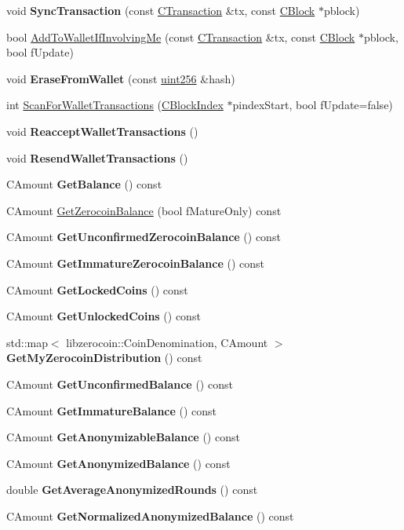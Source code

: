 \begin{DoxyCompactItemize}
void {\bfseries Sync\+Transaction} (const \mbox{\hyperlink{class_c_transaction}{C\+Transaction}} \&tx, const \mbox{\hyperlink{class_c_block}{C\+Block}} $\ast$pblock)
\item 
bool \mbox{\hyperlink{group__map_wallet_ga487f7cba517d37d24e5fa422711574d9}{Add\+To\+Wallet\+If\+Involving\+Me}} (const \mbox{\hyperlink{class_c_transaction}{C\+Transaction}} \&tx, const \mbox{\hyperlink{class_c_block}{C\+Block}} $\ast$pblock, bool f\+Update)
\item 
void {\bfseries Erase\+From\+Wallet} (const \mbox{\hyperlink{classuint256}{uint256}} \&hash)
\item 
int \mbox{\hyperlink{group__map_wallet_ga979a17e80e4897ed1f4ae9a4be7c493c}{Scan\+For\+Wallet\+Transactions}} (\mbox{\hyperlink{class_c_block_index}{C\+Block\+Index}} $\ast$pindex\+Start, bool f\+Update=false)
\item 
void {\bfseries Reaccept\+Wallet\+Transactions} ()
\item 
void {\bfseries Resend\+Wallet\+Transactions} ()
\item 
C\+Amount {\bfseries Get\+Balance} () const
\item 
C\+Amount \mbox{\hyperlink{group___actions_gaba22138d6c6eabe35feed7570a78ee7d}{Get\+Zerocoin\+Balance}} (bool f\+Mature\+Only) const
\item 
C\+Amount {\bfseries Get\+Unconfirmed\+Zerocoin\+Balance} () const
\item 
C\+Amount {\bfseries Get\+Immature\+Zerocoin\+Balance} () const
\item 
C\+Amount {\bfseries Get\+Locked\+Coins} () const
\item 
C\+Amount {\bfseries Get\+Unlocked\+Coins} () const
\item 
std\+::map$<$ libzerocoin\+::\+Coin\+Denomination, C\+Amount $>$ {\bfseries Get\+My\+Zerocoin\+Distribution} () const
\item 
C\+Amount {\bfseries Get\+Unconfirmed\+Balance} () const
\item 
C\+Amount {\bfseries Get\+Immature\+Balance} () const
\item 
C\+Amount {\bfseries Get\+Anonymizable\+Balance} () const
\item 
C\+Amount {\bfseries Get\+Anonymized\+Balance} () const
\item 
double {\bfseries Get\+Average\+Anonymized\+Rounds} () const
\item 
C\+Amount {\bfseries Get\+Normalized\+Anonymized\+Balance} () const
\item 

\end{DoxyCompactItemize}
